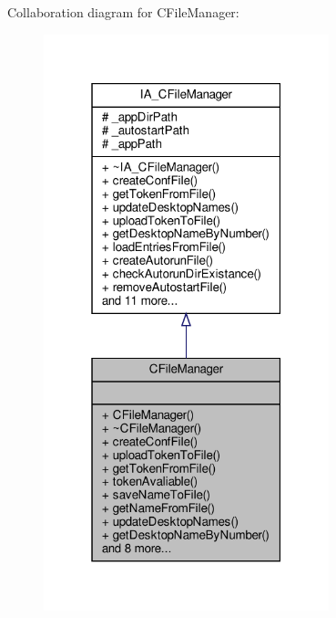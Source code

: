 Collaboration diagram for C\+File\+Manager\+:
\nopagebreak
\begin{figure}[H]
\begin{center}
\leavevmode
\includegraphics[width=235pt]{classCFileManager__coll__graph}
\end{center}
\end{figure}
